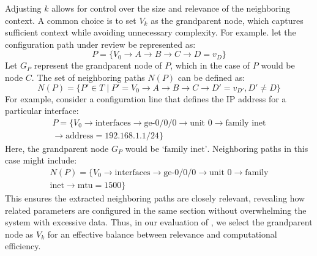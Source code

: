 Adjusting \( k \) allows for control over the size and relevance of the neighboring context.
A common choice is to set \( V_k \) as the grandparent node, which captures sufficient context while avoiding unnecessary complexity. For example. let the configuration path under review be represented as:
\[
P = \{V_0 \rightarrow A \rightarrow B \rightarrow C \rightarrow D = v_D \}
\]
Let \( G_P \) represent the grandparent node of \( P \), which in the case of \( P \) would be node \( C \). The set of neighboring paths \( N(P) \) can be defined as:
\[
N(P) = \{ P' \in T \mid P' = V_0 \rightarrow A \rightarrow B \rightarrow C \rightarrow D' = v_{D'}, D' \neq D \}
\]
For example, consider a configuration line that defines the IP address for a particular interface:
\begin{multline*}
P = \{V_0 \rightarrow \text{interfaces} \rightarrow \text{ge-0/0/0} 
\rightarrow \text{unit 0} \rightarrow \text{family inet}\\
\rightarrow \text{address} = 192.168.1.1/24 \}
\end{multline*}
Here, the grandparent node \( G_P \) would be \( \text{`family inet'} \). Neighboring paths in this case might include:
\begin{multline*}
N(P) = \{V_0 \rightarrow \text{interfaces} \rightarrow \text{ge-0/0/0}
\rightarrow \text{unit 0} \rightarrow
\text{family}\\ \text{inet} \rightarrow \text{mtu} = 1500 \}
\end{multline*}
This ensures the extracted neighboring paths are closely relevant, revealing how related parameters are configured in the same section without overwhelming the system with excessive data. Thus, in our evaluation of \sysname{}, we select the grandparent node as  \( V_k \) for an effective balance between relevance and computational efficiency.


